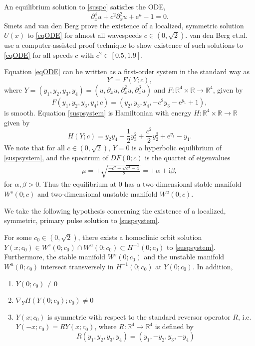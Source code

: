 \documentclass[review,onefignum,onetabnum]{siamart171218}
\newcommand{\R}{\mathbb{R}}
\newcommand{\rme}{\mathrm{e}}
\newcommand{\rmi}{\mathrm{i}}
\begin{document}
An equilibrium solution to \cref{suspc} satisfies the ODE,
\begin{equation}\label{eqODE}
\partial_x^4u +  c^2\partial_x^2u + \rme^{u} - 1 = 0.
\end{equation}
Smets and van den Berg \cite[Theorem 11]{Smets2002} prove the existence of a localized, symmetric solution $U(x)$ to \cref{eqODE} for almost all wavespeeds $c \in (0, \sqrt{2})$. van den Berg et.al. \cite[Theorem~1]{Berg2018} use a computer-assisted proof technique to show existence of such solutions to \cref{eqODE} for all speeds $c$ with $c^2 \in [0.5, 1.9]$. 

Equation \cref{eqODE} can be written as a first-order system in the standard way as 
\begin{equation}\label{suspsystem}
Y' = F(Y; c),
\end{equation}
where $Y = (y_1, y_2, y_3, y_4) = (u, \partial_x u, \partial_x^2 u, \partial_x^3 u)$ and $F: \R^4 \times \R \rightarrow \R^4$, given by
\begin{equation}\label{suspF}
F(y_1, y_2, y_3, y_4; c) = (y_2, y_3, y_4, -c^2 y_3 - \rme^{y_1} + 1),
\end{equation}
is smooth. Equation \cref{suspsystem} is Hamiltonian with energy $H:\R^4 \times \R \rightarrow \R$ given by
\begin{equation}\label{suspH}
H(Y; c) = y_2 y_4 - \frac{1}{2}y_3^2 + \frac{c^2}{2}y_2^2 + \rme^{y_1} - y_1.
\end{equation}
We note that for all $c \in (0, \sqrt{2})$, $Y = 0$ is a hyperbolic equilibrium of \cref{suspsystem}, and the spectrum of $DF(0; c)$ is the quartet of eigenvalues
\begin{align}\label{specA00}
\mu = \pm \sqrt{\frac{-c^2 \pm \sqrt{c^4 - 4}}{2} } = \pm \alpha \pm \rmi\beta,
\end{align}
for $\alpha, \beta > 0$. Thus the equilibrium at 0 has a two-dimensional stable manifold $W^s(0; c)$ and two-dimensional unstable manifold $W^u(0; c)$.

We take the following hypothesis concerning the existence of a localized, symmetric, primary pulse solution to \cref{suspsystem}.
\begin{hypothesis}\label{Uexistshyp}
For some $c_0 \in (0, \sqrt{2})$, there exists a homoclinic orbit solution $Y(x; c_0) \in W^s(0; c_0) \cap W^u(0; c_0) \subset H^{-1}(0; c_0)$ to \cref{suspsystem}. Furthermore, the stable manifold $W^s(0; c_0)$ and the unstable manifold $W^u(0; c_0)$ intersect transversely in $H^{-1}(0; c_0)$ at $Y(0; c_0)$. In addition,
\begin{enumerate}
\item $Y(0; c_0) \neq 0$
\item $\nabla_Y H(Y(0; c_0); c_0) \neq 0$
\item $Y(x; c_0)$ is symmetric with respect to the standard reversor operator $R$, i.e. $Y(-x; c_0) = R Y(x; c_0)$, where $R: \R^4 \rightarrow \R^4$ is defined by
\[
R(y_1, y_2, y_3, y_4) = (y_1, -y_2, y_3, -y_4)
\]
\end{enumerate}
\end{hypothesis}
\end{document}
